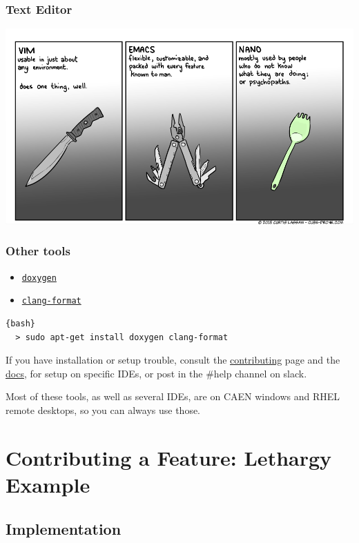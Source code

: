 \documentclass{beamer}
\begin{document}
\begin{frame}
\frametitle{Text Editor}
\centering
\includegraphics[scale=0.3]{../resources/txt.png}
\end{frame}

\begin{frame}[fragile]
\frametitle{Other tools}

\begin{itemize}
  \item \href{http://www.doxygen.nl/}{\texttt{doxygen}}
  \item \href{https://clang.llvm.org/docs/ClangFormat.html}
    {\texttt{clang-format}}
\end{itemize}

\begin{lstlisting}{bash}
  > sudo apt-get install doxygen clang-format
\end{lstlisting}

If you have installation or setup trouble, consult the \href{https://github.com/umcpt/mc-hammer-2/blob/develop/CONTRIBUTING.md}{contributing} page and the \href{https://github.com/umcpt/mc-hammer-2/tree/develop/docs}{docs}, for setup on specific IDEs, or post in the #help channel on slack.

Most of these tools, as well as several IDEs, are on CAEN windows and RHEL remote desktops, so you can always use those. 


\end{frame}

\section{Contributing a Feature: Lethargy Example}

\subsection{Implementation}
\end{document}
